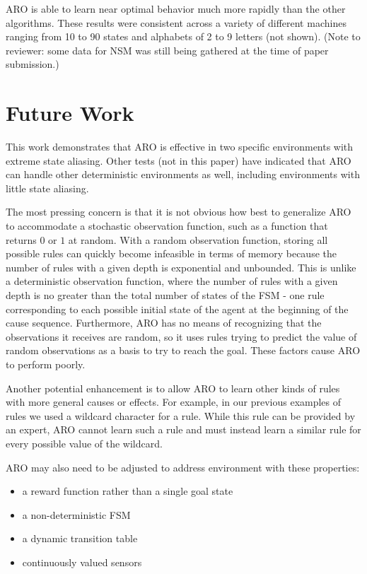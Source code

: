 \documentclass[letterpaper]{article} %
\begin{document}
ARO is able to learn near optimal behavior much more rapidly than the
other algorithms.  These results were consistent across a variety of
different machines ranging from 10 to 90 states and alphabets of 2 to
9 letters (not shown). (Note to reviewer: some data for NSM was still being
gathered at the time of paper submission.)

\section{Future Work}

This work demonstrates that ARO is effective in two specific
environments with extreme state aliasing. Other tests (not in this
paper) have indicated that ARO can handle other deterministic
environments as well, including environments with little state
aliasing.

The most pressing concern is that it is not obvious how best to
generalize ARO to accommodate a stochastic observation function, such
as a function that returns $0$ or $1$ at random. With a random
observation function, storing all possible rules can quickly become
infeasible in terms of memory because the number of rules with a given
depth is exponential and unbounded. This is unlike a deterministic
observation function, where the number of rules with a given depth is
no greater than the total number of states of the FSM - one rule
corresponding to each possible initial state of the agent at the
beginning of the cause sequence. Furthermore, ARO has no means of
recognizing that the observations it receives are random, so it uses
rules trying to predict the value of random observations as a basis to
try to reach the goal. These factors cause ARO to perform poorly.

Another potential enhancement is to allow ARO to learn other kinds of
rules with more general causes or effects. For example, in our
previous examples of rules we used a wildcard character for a
rule. While this rule can be provided by an expert, ARO cannot learn
such a rule and must instead learn a similar rule for every possible
value of the wildcard.

ARO may also need to be adjusted to address environment with these
properties:
\begin{itemize}
\item a reward function rather than a single goal state
\item a non-deterministic FSM
\item a dynamic transition table
\item continuously valued sensors
\end{itemize}
\end{document}
